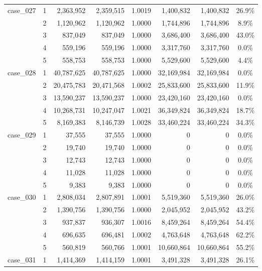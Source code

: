 \begin{footnotesize}
\begin{longtable}{l c rr c rr c}
\addlinespace[2pt]
case\_027 & 1 & 2{,}363{,}952 & 2{,}359{,}515 & 1.0019 & 1{,}400{,}832 & 1{,}400{,}832 & 26.9\% \\
 & 2 & 1{,}120{,}962 & 1{,}120{,}962 & 1.0000 & 1{,}744{,}896 & 1{,}744{,}896 & 8.9\% \\
 & 3 & 837{,}049 & 837{,}049 & 1.0000 & 3{,}686{,}400 & 3{,}686{,}400 & 43.0\% \\
 & 4 & 559{,}196 & 559{,}196 & 1.0000 & 3{,}317{,}760 & 3{,}317{,}760 & 0.0\% \\
 & 5 & 558{,}753 & 558{,}753 & 1.0000 & 5{,}529{,}600 & 5{,}529{,}600 & 4.4\% \\
\addlinespace[2pt]
case\_028 & 1 & 40{,}787{,}625 & 40{,}787{,}625 & 1.0000 & 32{,}169{,}984 & 32{,}169{,}984 & 0.0\% \\
 & 2 & 20{,}475{,}783 & 20{,}471{,}568 & 1.0002 & 25{,}833{,}600 & 25{,}833{,}600 & 11.9\% \\
 & 3 & 13{,}590{,}237 & 13{,}590{,}237 & 1.0000 & 23{,}420{,}160 & 23{,}420{,}160 & 0.0\% \\
 & 4 & 10{,}268{,}731 & 10{,}247{,}047 & 1.0021 & 36{,}349{,}824 & 36{,}349{,}824 & 18.7\% \\
 & 5 & 8{,}169{,}383 & 8{,}146{,}739 & 1.0028 & 33{,}460{,}224 & 33{,}460{,}224 & 34.3\% \\
\addlinespace[2pt]
case\_029 & 1 & 37{,}555 & 37{,}555 & 1.0000 & 0 & 0 & 0.0\% \\
 & 2 & 19{,}740 & 19{,}740 & 1.0000 & 0 & 0 & 0.0\% \\
 & 3 & 12{,}743 & 12{,}743 & 1.0000 & 0 & 0 & 0.0\% \\
 & 4 & 11{,}028 & 11{,}028 & 1.0000 & 0 & 0 & 0.0\% \\
 & 5 & 9{,}383 & 9{,}383 & 1.0000 & 0 & 0 & 0.0\% \\
\addlinespace[2pt]
case\_030 & 1 & 2{,}808{,}034 & 2{,}807{,}891 & 1.0001 & 5{,}519{,}360 & 5{,}519{,}360 & 26.0\% \\
 & 2 & 1{,}390{,}756 & 1{,}390{,}756 & 1.0000 & 2{,}045{,}952 & 2{,}045{,}952 & 43.2\% \\
 & 3 & 937{,}837 & 936{,}307 & 1.0016 & 8{,}459{,}264 & 8{,}459{,}264 & 54.4\% \\
 & 4 & 696{,}635 & 696{,}481 & 1.0002 & 4{,}763{,}648 & 4{,}763{,}648 & 62.2\% \\
 & 5 & 560{,}819 & 560{,}766 & 1.0001 & 10{,}660{,}864 & 10{,}660{,}864 & 55.2\% \\
\addlinespace[2pt]
case\_031 & 1 & 1{,}414{,}369 & 1{,}414{,}159 & 1.0001 & 3{,}491{,}328 & 3{,}491{,}328 & 26.1\% \\

\end{longtable}
\end{footnotesize}
